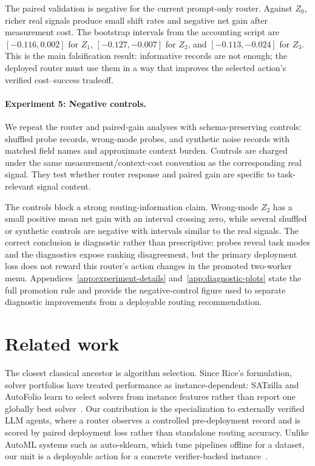 \documentclass{article}
\newcounter{algorithm}
\begin{document}
The paired validation is negative for the current prompt-only router.
Against \(Z_0\), richer real signals produce small shift rates and negative net gain after measurement cost.
The bootstrap intervals from the accounting script are \([-0.116,0.002]\) for \(Z_1\), \([-0.127,-0.007]\) for \(Z_2\), and \([-0.113,-0.024]\) for \(Z_3\).
This is the main falsification result: informative records are not enough; the deployed router must use them in a way that improves the selected action's verified cost--success tradeoff.

\paragraph{Experiment 5: Negative controls.}
We repeat the router and paired-gain analyses with schema-preserving controls: shuffled probe records, wrong-mode probes, and synthetic noise records with matched field names and approximate context burden.
Controls are charged under the same measurement/context-cost convention as the corresponding real signal.
They test whether router response and paired gain are specific to task-relevant signal content.

The controls block a strong routing-information claim.
Wrong-mode \(Z_2\) has a small positive mean net gain with an interval crossing zero, while several shuffled or synthetic controls are negative with intervals similar to the real signals.
The correct conclusion is diagnostic rather than prescriptive: probes reveal task modes and the diagnostics expose ranking disagreement, but the primary deployment loss does not reward this router's action changes in the promoted two-worker menu.
Appendices~\ref{app:experiment-details} and~\ref{app:diagnostic-plots} state the full promotion rule and provide the negative-control figure used to separate diagnostic improvements from a deployable routing recommendation.

\section{Related work}
\label{sec:related}

The closest classical ancestor is algorithm selection.
Since Rice's formulation, solver portfolios have treated performance as instance-dependent: SATzilla and AutoFolio learn to select solvers from instance features rather than report one globally best solver~\citep{rice1976algorithm,xu2012satzilla,lindauer2015autofolio,kotthoff2016algorithm}.
Our contribution is the specialization to externally verified LLM agents, where a router observes a controlled pre-deployment record and is scored by paired deployment loss rather than standalone routing accuracy.
Unlike AutoML systems such as auto-sklearn, which tune pipelines offline for a dataset, our unit is a deployable action for a concrete verifier-backed instance~\citep{feurer2015autosklearn}.
\end{document}
